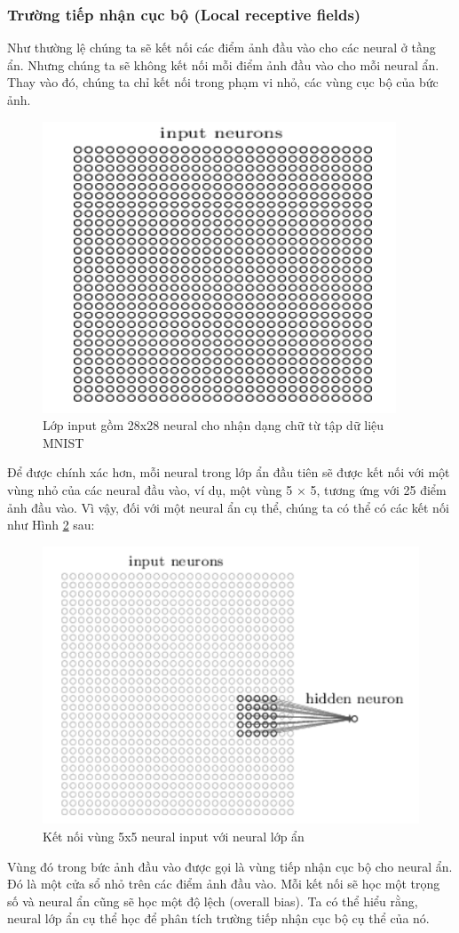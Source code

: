 \subsubsection{Trường tiếp nhận cục bộ (Local receptive fields)}
Như thường lệ chúng ta sẽ kết nối các điểm ảnh đầu vào cho các neural ở tầng 
ẩn. Nhưng chúng ta sẽ không kết nối mỗi điểm ảnh đầu vào cho mỗi neural ẩn. Thay 
vào đó, chúng ta chỉ kết nối trong phạm vi nhỏ, các vùng cục bộ của bức ảnh.
\begin{figure}[H]
	\centering
	\includegraphics[width=0.5\linewidth]{images/lopinput.png}
	\caption{Lớp input gồm 28x28 neural cho nhận dạng chữ từ tập dữ liệu MNIST}
	\label{fig:lopinput}
\end{figure}
Để được chính xác hơn, mỗi neural trong lớp ẩn đầu tiên sẽ được kết nối với 
một vùng nhỏ của các neural đầu vào, ví dụ, một vùng 5 × 5, tương ứng với 25 điểm ảnh đầu vào. Vì vậy, đối với một neural ẩn cụ thể, chúng ta có thể có các kết nối như Hình \ref{fig:ketnoivung} sau:
\begin{figure}[H]
	\centering
	\includegraphics[width=0.6\linewidth]{images/ketnoivung.png}
	\caption{Kết nối vùng 5x5 neural input với neural lớp ẩn}
	\label{fig:ketnoivung}
\end{figure}
Vùng đó trong bức ảnh đầu vào được gọi là vùng tiếp nhận cục bộ cho neural 
ẩn. Đó là một cửa sổ nhỏ trên các điểm ảnh đầu vào. Mỗi kết nối sẽ học một trọng số
và neural ẩn cũng sẽ học một độ lệch (overall bias). Ta có thể hiểu rằng, neural lớp ẩn 
cụ thể học để phân tích trường tiếp nhận cục bộ cụ thể của nó.


